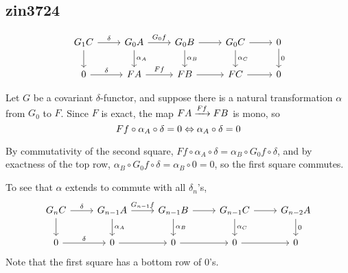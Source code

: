 \subsection{zin3724}
\[ 
\begin{tikzcd}
    G_1C \arrow[r, "\delta"] \arrow[d] & G_0A \arrow[r, "G_0f"] \arrow[d, "\alpha_A"] & G_0B \arrow[r] \arrow[d, "\alpha_B"] & G_0C \arrow[r] \arrow[d, "\alpha_C"] & 0 \arrow[d, "0"] \\
    0 \arrow[r, "\delta"]              & FA \arrow[r, "Ff"]                         & FB \arrow[r]                         & FC \arrow[r]                         & 0               
    \end{tikzcd}
\]

Let $G$ be a covariant $\delta$-functor, and suppose there is a natural transformation $\alpha$ from $G_0$ to $F$. Since $F$ is exact, the map $FA\xrightarrow{Ff}FB$ is mono, so \[Ff\circ\alpha_A\circ\delta=0\Leftrightarrow\alpha_A\circ\delta=0\]

By commutativity of the second square, $Ff\circ\alpha_A\circ\delta=\alpha_B\circ G_0f\circ\delta$, and by exactness of the top row, $\alpha_B\circ G_0f\circ\delta=\alpha_B\circ0=0$, so the first square commutes.

To see that $\alpha$ extends to commute with all $\delta_n$'s,
\[
\begin{tikzcd}
    G_nC \arrow[r, "\delta"] \arrow[d] & G_{n-1}A \arrow[r, "G_{n-1}f"] \arrow[d, "\alpha_A"] & G_{n-1}B \arrow[r] \arrow[d, "\alpha_B"] & G_{n-1}C \arrow[r] \arrow[d, "\alpha_C"] & G_{n-2}A \arrow[d, "0"] \\
    0 \arrow[r, "\delta"]              & 0 \arrow[r]                                          & 0 \arrow[r]                              & 0 \arrow[r]                              & 0                      
    \end{tikzcd}
\]
Note that the first square has a bottom row of 0's.